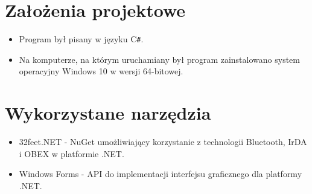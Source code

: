 \documentclass[12pt,a4paper,notitlepage]{report}
\begin{document}
\section{Założenia projektowe}
\begin{itemize}
\item Program był pisany w języku C\texttt{\#}.
\item Na komputerze, na którym uruchamiany był program zainstalowano system operacyjny Windows 10 w wersji 64-bitowej.
\end{itemize}

\section{Wykorzystane narzędzia}
\begin{itemize}
\item 32feet.NET - NuGet umożliwiający korzystanie z technologii Bluetooth, IrDA i OBEX w platformie .NET.
\item Windows Forms - API do implementacji interfejsu graficznego dla platformy .NET.
\end{itemize}
\end{document}
